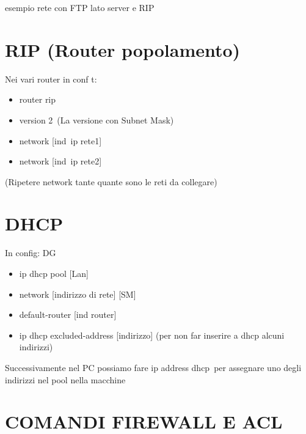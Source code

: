 \documentclass[
]{article}
\providecommand{\tightlist}{%
  \setlength{\itemsep}{0pt}\setlength{\parskip}{0pt}}
\begin{document}
{esempio rete con FTP lato server e RIP}

{}

{}

{}

{}

{}

{}

\section{\texorpdfstring{{RIP (Router
popolamento)}}{RIP (Router popolamento)}}\label{h.x9ow7djidmcf}

{Nei vari router in conf t:}

\begin{itemize}
\tightlist
\item
  {router rip}
\item
  {version 2}{~(La versione con Subnet Mask)}
\item
  {network {[}}{ind}{~ip rete1{]}}
\item
  {network {[}}{ind}{~ip rete2{]}}
\end{itemize}

{(Ripetere network tante quante sono le reti da collegare)}

{}

{}

\section{\texorpdfstring{{DHCP}}{DHCP}}\label{h.qf2faznjzg5x}

{In config: DG }

\begin{itemize}
\tightlist
\item
  {ip dhcp pool {[}Lan{]}}
\item
  {network {[}indirizzo di rete{]} {[}SM{]}}
\item
  {default-router {[}ind router{]}}
\item
  {ip dhcp excluded-address {[}indirizzo{]} }{(per non far inserire a
  dhcp alcuni indirizzi)}
\end{itemize}

{}

{Successivamente nel PC possiamo fare }{ip address dhcp}{~per assegnare
uno degli indirizzi nel pool nella macchine}

{}

{}

\section{\texorpdfstring{{COMANDI FIREWALL E
ACL}}{COMANDI FIREWALL E ACL}}\label{h.tig490l5zolq}
\end{document}

